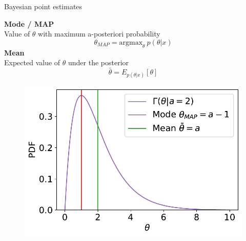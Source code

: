 \documentclass[
aspectratio=169,
14pt,
professionalfonts
]{beamer}
\begin{document}

\begin{frame}{Bayesian point estimates}
    \begin{minipage}{0.49\textwidth}
        \textbf{Mode / MAP}\\ Value of $\theta$ with maximum a-posteriori probability
            $$\theta_{MAP} = \text{argmax}_\theta ~ p(\theta|x)$$
        \textbf{Mean}\\ Expected value of $\theta$ under the posterior
            $$ \bar{\theta} = E_{p(\theta|x)}[\theta]$$
    \end{minipage}
    \begin{minipage}{0.49\textwidth}
        \begin{figure}
            \centering
            \includegraphics[width=\linewidth]{../plots/map_vs_mean.pdf}
        \end{figure}
    \end{minipage}
\end{frame}
\end{document}

